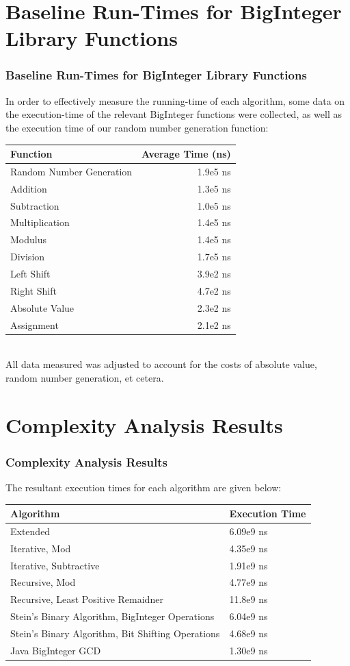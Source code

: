 \documentclass{beamer}
\begin{document}
\section{Baseline Run-Times for BigInteger Library Functions}
\begin{frame}
\frametitle{Baseline Run-Times for BigInteger Library Functions}
\small
\indent In order to effectively measure the running-time of each algorithm, some data on the execution-time of the relevant BigInteger functions were collected, as well as the execution time of our random number generation function: \\
\begin{tabular}{|l|r|}
\hline
Function & Average Time (ns) \\ \hline
Random Number Generation & 1.9e5 ns \\ \hline
Addition & 1.3e5 ns \\ \hline
Subtraction & 1.0e5 ns \\ \hline
Multiplication & 1.4e5 ns \\ \hline
Modulus & 1.4e5 ns \\ \hline
Division & 1.7e5 ns \\ \hline
Left Shift & 3.9e2 ns \\ \hline
Right Shift & 4.7e2 ns \\ \hline
Absolute Value & 2.3e2 ns \\ \hline
Assignment & 2.1e2 ns \\ \hline

\end{tabular}
\small
\\ \indent All data measured was adjusted to account for the costs of absolute value, random number generation, et cetera.
\end{frame}
\section{Complexity Analysis Results}
\begin{frame}
\frametitle{Complexity Analysis Results}
The resultant execution times for each algorithm are given below:

\begin{tabular}{|l|l|}
\hline
	\textbf{Algorithm} & \textbf{Execution Time}
	\\
	\hline Extended & 6.09e9 ns\\
	\hline Iterative, Mod & 4.35e9 ns\\
	\hline Iterative, Subtractive & 1.91e9 ns\\
	\hline Recursive, Mod & 4.77e9 ns\\
	\hline Recursive, Least Positive Remaidner
 & 11.8e9 ns\\
	\hline Stein’s Binary Algorithm, BigInteger Operations & 6.04e9 ns\\
	\hline Stein’s Binary Algorithm, Bit Shifting Operations & 4.68e9 ns\\
	\hline Java BigInteger GCD & 1.30e9 ns\\
	\hline
\end{tabular}

\end{frame}
\end{document}
